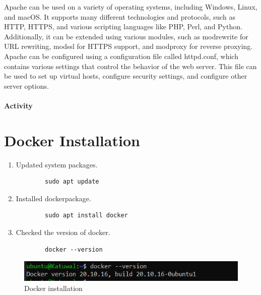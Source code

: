 \documentclass[12pt]{article}
\begin{document}
Apache can be used on a variety of operating systems, including Windows, Linux, and macOS. It supports many different technologies and protocols, such as HTTP, HTTPS, and various scripting languages like PHP, Perl, and Python. Additionally, it can be extended using various modules, such as mod\textunderscore rewrite for URL rewriting, mod\textunderscore ssl for HTTPS support, and mod\textunderscore proxy for reverse proxying.
Apache can be configured using a configuration file called httpd.conf, which contains various settings that control the behavior of the web server. This file can be used to set up virtual hosts, configure security settings, and configure other server options.

\paragraph{Activity}
\section{Docker Installation}
\begin{enumerate}
    \item Updated system packages.
    \begin{verbatim}
        sudo apt update
    \end{verbatim}
    \item Installed dockerpackage.
    \begin{verbatim}
        sudo apt install docker 
    \end{verbatim}
    \item Checked the version of docker.
    \begin{verbatim}
        docker --version
    \end{verbatim}
\end{enumerate}
\begin{figure}[h!]
    \centering
    \includegraphics[scale = 0.70]{Images/docker_version.PNG}
    \caption{Docker installation}
\end{figure}
\end{document}
